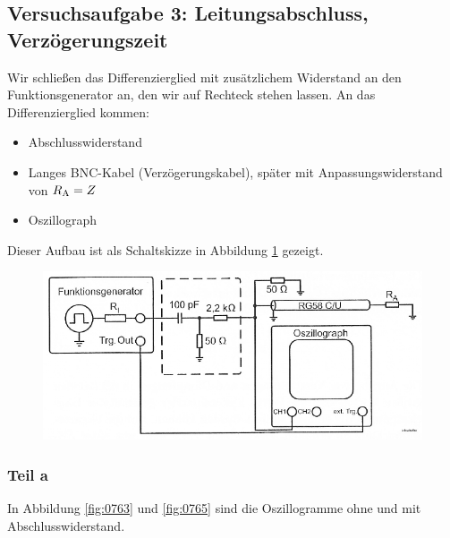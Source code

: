 \FloatBarrier
\subsection{Versuchsaufgabe 3: Leitungsabschluss, Verzögerungszeit}

Wir schließen das Differenzierglied mit zusätzlichem Widerstand an den
Funktionsgenerator an, den wir auf Rechteck stehen lassen. An das
Differenzierglied kommen:
%
\begin{itemize}
	\item
		Abschlusswiderstand
	\item
		Langes BNC-Kabel (Verzögerungskabel), später mit Anpassungswiderstand
		von $R_\text A = Z$
	\item
		Oszillograph
\end{itemize}

Dieser Aufbau ist als Schaltskizze in Abbildung \ref{fig:1-8} gezeigt.

\begin{figure}[htbp]
	\centering
	\includegraphics[width=.7\textwidth]{Schaltplan/1-8.png}
	\caption{%
		\cite[Abbildung~1.8]{physik313-Anleitung}
	}
	\label{fig:1-8}
\end{figure}


\FloatBarrier
\subsubsection{Teil a}

In Abbildung \ref{fig:0763} und \ref{fig:0765} sind die Oszillogramme ohne und
mit Abschlusswiderstand.

